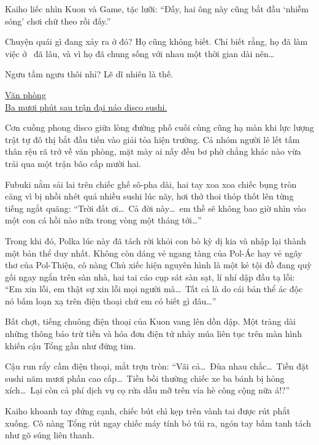 \documentclass[../main.tex]{subfiles}
\begin{document}
Kaiho liếc nhìn Kuon và Game, tặc lưỡi: ``Đấy, hai ông này cũng bắt đầu `nhiễm sóng' chơi chữ theo rồi đấy.''

Chuyện quái gì đang xảy ra ở đó? Họ cũng không biết. Chỉ biết rằng, họ đã làm việc ở \hll\ đã lâu, và vì họ đã chung sống với nhau một thời gian dài nên\dots

Ngưu tầm ngưu thôi nhỉ? Lẽ dĩ nhiên là thế.

\omk

\begin{center}
    \uline{Văn phòng \hll{}\\Ba mươi phút sau trận đại náo disco sushi.}
\end{center}

Cơn cuồng phong disco giữa lòng đường phố cuối cùng cũng hạ màn khi lực lượng trật tự đô thị bắt đầu tiến vào giải tỏa hiện trường. Cả nhóm người lê lết tấm thân rệu rã trở về văn phòng, mặt mày ai nấy đều bơ phờ chẳng khác nào vừa trải qua một trận bão cấp mười hai.

Fubuki nằm sải lai trên chiếc ghế sô-pha dài, hai tay xoa xoa chiếc bụng tròn căng vì bị nhồi nhét quá nhiều sushi lúc nãy, hơi thở thoi thóp thốt lên từng tiếng ngắt quãng: ``Trời đất ơi\dots\ Cả đời này\dots\ em thề sẽ không bao giờ nhìn vào một con cá hồi nào nữa trong vòng một tháng tới\dots''

Trong khi đó, Polka lúc này đã tách rời khỏi con bò kỳ dị kia và nhập lại thành một bản thể duy nhất. Không còn dáng vẻ ngang tàng của Pol-Ác hay vẻ ngây thơ của Pol-Thiện, cô nàng Chủ xiếc hiện nguyên hình là một kẻ tội đồ đang quỳ gối ngay ngắn trên sàn nhà, hai tai cáo cụp sát sàn sạt, lí nhí dập đầu tạ lỗi: ``Em xin lỗi, em thật sự xin lỗi mọi người mà\dots\ Tất cả là do cái bản thể ác độc nó bấm loạn xạ trên điện thoại chứ em có biết gì đâu\dots''

Bất chợt, tiếng chuông điện thoại của Kuon vang lên dồn dập. Một tràng dài những thông báo trừ tiền và hóa đơn điện tử nhảy múa liên tục trên màn hình khiến cậu Tổng gần như đứng tim.

Cậu run rẩy cầm điện thoại, mắt trợn tròn: ``Vãi cả\dots\ Đùa nhau chắc\dots\ Tiền đặt sushi năm mươi phần cao cấp\dots\ Tiền bồi thường chiếc xe ba bánh bị hỏng xích\dots\ Lại còn cả phí dịch vụ cọ rửa dầu mỡ trên vỉa hè công cộng nữa á!?''

Kaiho khoanh tay đứng cạnh, chiếc bút chì kẹp trên vành tai được rút phắt xuống. Cô nàng Tổng rút ngay chiếc máy tính bỏ túi ra, ngón tay bấm tanh tách như gõ súng liên thanh.
\end{document}
